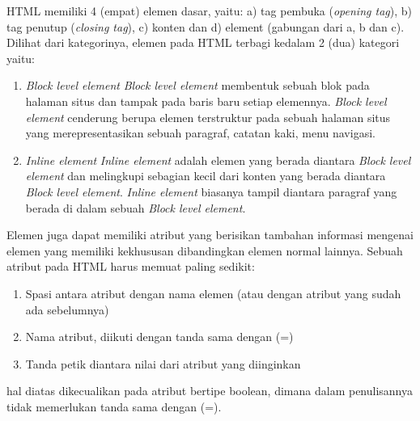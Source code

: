 \documentclass[pi.tex]{subfile}
\begin{document}
\hspace{10pt}HTML memiliki 4 (empat) elemen dasar, yaitu: a) tag pembuka (\emph{opening tag}), b) tag penutup (\emph{closing tag}), c) konten dan d) element (gabungan dari a, b dan c). Dilihat dari kategorinya, elemen pada HTML terbagi kedalam 2 (dua) kategori yaitu:
\begin{enumerate}[leftmargin=1.65cm]
\item \emph{Block level element}
  \emph{Block level element} membentuk sebuah blok pada halaman situs dan tampak pada baris baru setiap elemennya. \emph{Block level element} cenderung berupa elemen terstruktur pada sebuah halaman situs yang merepresentasikan sebuah paragraf, catatan kaki, menu navigasi.
\item \emph{Inline element}
  \emph{Inline element} adalah elemen yang berada diantara \emph{Block level element} dan melingkupi sebagian kecil dari konten yang berada diantara \emph{Block level element}. \emph{Inline element} biasanya tampil diantara paragraf yang berada di dalam sebuah \emph{Block level element}.
\end{enumerate}

\hspace{10pt}Elemen juga dapat memiliki atribut yang berisikan tambahan informasi mengenai elemen yang memiliki kekhususan dibandingkan elemen normal lainnya. Sebuah atribut pada HTML harus memuat paling sedikit:
\begin{enumerate}[leftmargin=1.65cm]
\item Spasi antara atribut dengan nama elemen (atau dengan atribut yang sudah ada sebelumnya)
\item Nama atribut, diikuti dengan tanda sama dengan (=)
\item Tanda petik diantara nilai dari atribut yang diinginkan
\end{enumerate}
hal diatas dikecualikan pada atribut bertipe boolean, dimana dalam penulisannya tidak memerlukan tanda sama dengan (=).
\end{document}

